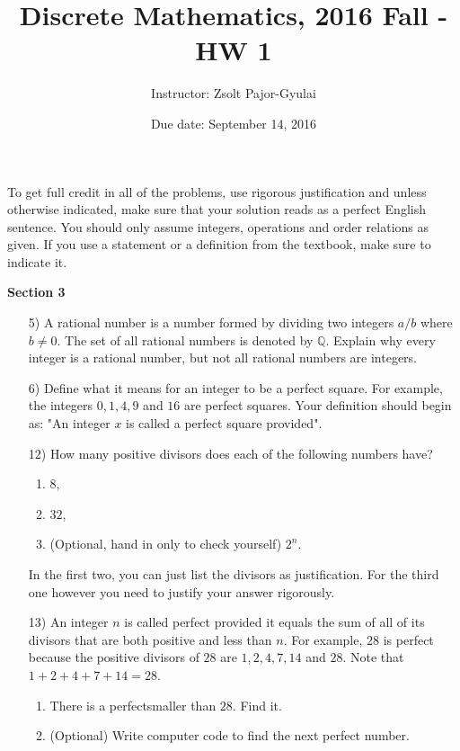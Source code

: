 \documentclass[11pt]{preprint}
\title{Discrete Mathematics, 2016 Fall - HW 1}
\author{Instructor: Zsolt Pajor-Gyulai}
\institute{Courant Institute of Mathematical Sciences, NYU}
\date{Due date: September 14, 2016}
\begin{document}
\maketitle

To get full credit  in all of the problems, use rigorous justification and unless otherwise indicated, make sure that your solution reads as a perfect English sentence. You should only assume integers, operations and order relations as given. If you use a statement or a definition from the textbook, make sure to indicate it.
\vspace{0.2cm}

\textbf{Section 3}
\begin{enumerate}
\item[5)] A rational number is a number formed by dividing two integers $a/b$ where $b\neq 0$. The set of all rational numbers is denoted by $\mathbb{Q}$. Explain why every integer is a rational number, but not all rational numbers are integers.

\item[6)] Define what it means for an integer to be a perfect square. For example, the integers $0, 1,4,9$ and $16$ are perfect squares. Your definition should begin as: "An integer $x$ is called a perfect square provided".

\item[12)] How many positive divisors does each of the following numbers have?
\begin{enumerate}
\item $8$,
\item $32$,
\item (Optional, hand in only to check yourself) $2^n$.
\end{enumerate}
In the first two, you can just list the divisors as justification. For the third one however you need to justify your answer rigorously.


\item[13)] An integer $n$ is called perfect provided it equals the sum of all of its divisors that are both positive and less than $n$. For example, $28$ is perfect because the positive divisors of $28$ are $1,2,4,7,14$ and $28$. Note that $1+2+4+7+14=28$.
\begin{enumerate}
\item There is a perfectsmaller than $28$. Find it.
\item (Optional) Write computer code to find the next perfect number.
\end{enumerate}
\end{enumerate}
\end{document}
